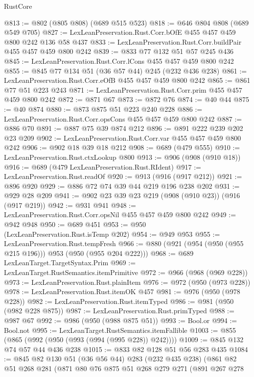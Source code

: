 \begin{lexlean}{RustCore}
\begin{coremodule}
{\begin{coremodule}
{{{{{@813 := @802 (@805 @808) (@689 @515 @523)
@818 := @646 @804 @808 (@689 @549 @705)
@827 := LexLeanPreservation.Rust.Corr.bOfE @455 @457 @459 @800 @242 @136 @58 @437
@833 := LexLeanPreservation.Rust.Corr.buildPair @455 @457 @459 @800 @242
@839 := @833 @77 @132 @51 @57 @245 @436
@845 := LexLeanPreservation.Rust.Corr.lCons @455 @457 @459 @800 @242
@855 := @845 @77 @134 @51 (@36 @57 @44) @245 (@232 @436 @238)
@861 := LexLeanPreservation.Rust.Corr.eOfB @455 @457 @459 @800 @242
@865 := @861 @77 @51 @223 @243
@871 := LexLeanPreservation.Rust.Corr.prim @455 @457 @459 @800 @242
@872 := @871 @67
@873 := @872 @76
@874 := @40 @44
@875 := @40 @874
@880 := @873 @875 @51 @223 @240 @228
@886 := LexLeanPreservation.Rust.Corr.opsCons @455 @457 @459 @800 @242
@887 := @886 @70
@891 := @887 @75 @39 @874 @212
@896 := @891 @222 @239 @202 @23 @209
@902 := LexLeanPreservation.Rust.Corr.var @455 @457 @459 @800 @242
@906 := @902 @18 @39 @18 @212
@908 := @689 (@479 @555)
@910 := LexLeanPreservation.Rust.ctxLookup @800
@913 := @906 (@908 (@910 @18))
@916 := @689 (@479 LexLeanPreservation.Rust.RIdent)
@917 := LexLeanPreservation.Rust.readOf
@920 := @913 (@916 (@917 @212))
@921 := @896 @920
@929 := @886 @72 @74 @39 @44 @219 @196 @238 @202
@931 := @929 @28 @209
@941 := @902 @23 @39 @23 @219 (@908 (@910 @23)) (@916 (@917 @219))
@942 := @931 @941
@948 := LexLeanPreservation.Rust.Corr.opsNil @455 @457 @459 @800 @242
@949 := @942 @948
@950 := @689 @451
@953 := @950 (LexLeanPreservation.Rust.isTemp @202)
@954 := @949 @953
@955 := LexLeanPreservation.Rust.tempFresh
@966 := @880 (@921 (@954 (@950 (@955 @215 @196))) @953 (@950 (@955 @204 @222)))
@968 := @689 LexLeanTarget.TargetSyntax.Prim
@969 := LexLeanTarget.RustSemantics.itemPrimitive
@972 := @966 (@968 (@969 @228))
@973 := LexLeanPreservation.Rust.plainItem
@976 := @972 (@950 (@973 @228))
@978 := LexLeanPreservation.Rust.itemOK @457
@981 := @976 (@950 (@978 @228))
@982 := LexLeanPreservation.Rust.itemTyped
@986 := @981 (@950 (@982 @228 @875))
@987 := LexLeanPreservation.Rust.primTyped
@988 := @987 @67
@992 := @986 (@950 (@988 @875 @51))
@993 := Bool.or
@994 := Bool.not
@995 := LexLeanTarget.RustSemantics.itemFallible
@1003 := @855 (@865 (@992 (@950 (@993 (@994 (@995 @228)) @242))))
@1009 := @845 @132 @74 @57 @44 @436 @238
@1015 := @833 @82 @128 @51 @56 @283 @435
@1084 := @845
    @82
    @130
    @51
    (@36 @56 @44)
    @283
    (@232 @435 @238)
    (@861
      @82
      @51
      @268
      @281
      (@871
        @80
        @76
        @875
        @51
        @268
        @279
        @271
        (@891
          @267
          @278
}}}}}
\end{coremodule}}
\end{coremodule}
\end{lexlean}
